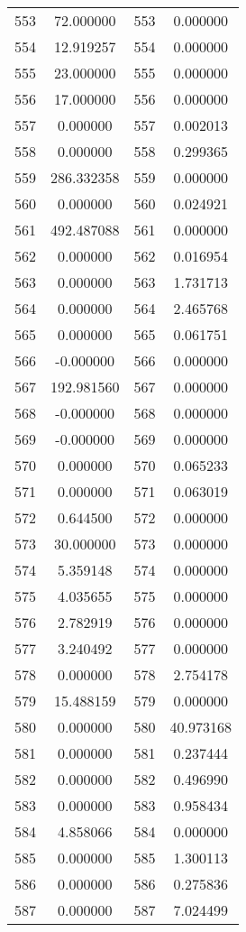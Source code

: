 \documentclass[12pt]{article}
\begin{document}
\begin{longtable}{@{}cccc@{}}
553 & 72.000000 & 553 & 0.000000 \\
554 & 12.919257 & 554 & 0.000000 \\
555 & 23.000000 & 555 & 0.000000 \\
556 & 17.000000 & 556 & 0.000000 \\
557 & 0.000000 & 557 & 0.002013 \\
558 & 0.000000 & 558 & 0.299365 \\
559 & 286.332358 & 559 & 0.000000 \\
560 & 0.000000 & 560 & 0.024921 \\
561 & 492.487088 & 561 & 0.000000 \\
562 & 0.000000 & 562 & 0.016954 \\
563 & 0.000000 & 563 & 1.731713 \\
564 & 0.000000 & 564 & 2.465768 \\
565 & 0.000000 & 565 & 0.061751 \\
566 & -0.000000 & 566 & 0.000000 \\
567 & 192.981560 & 567 & 0.000000 \\
568 & -0.000000 & 568 & 0.000000 \\
569 & -0.000000 & 569 & 0.000000 \\
570 & 0.000000 & 570 & 0.065233 \\
571 & 0.000000 & 571 & 0.063019 \\
572 & 0.644500 & 572 & 0.000000 \\
573 & 30.000000 & 573 & 0.000000 \\
574 & 5.359148 & 574 & 0.000000 \\
575 & 4.035655 & 575 & 0.000000 \\
576 & 2.782919 & 576 & 0.000000 \\
577 & 3.240492 & 577 & 0.000000 \\
578 & 0.000000 & 578 & 2.754178 \\
579 & 15.488159 & 579 & 0.000000 \\
580 & 0.000000 & 580 & 40.973168 \\
581 & 0.000000 & 581 & 0.237444 \\
582 & 0.000000 & 582 & 0.496990 \\
583 & 0.000000 & 583 & 0.958434 \\
584 & 4.858066 & 584 & 0.000000 \\
585 & 0.000000 & 585 & 1.300113 \\
586 & 0.000000 & 586 & 0.275836 \\
587 & 0.000000 & 587 & 7.024499 \\

\end{longtable}
\end{document}
